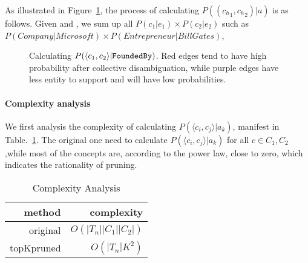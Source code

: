 \begin{example}
\label{exa:pggga}
As illustrated in Figure~\ref{fig:bipartite}, the process of calculating $P(({c_h}_{1},{c_h}_{2}) |a)$ is as follows.
Given  and , we sum up all $P(c_1|e_1)\times P(c_2|e_2) $ such as $P(Company|Microsoft) \times P(Entrepreneur|Bill Gates)$,
\end{example}


\begin{figure}[!htb]
\centering
{}
\caption{\small Calculating $P(  \langle {c}_{1},{c}_{2} \rangle  | {\tt FoundedBy} )$. Red edges tend to have high probability after collective disambiguation, while purple edges have less entity to support and will have low probabilities. }
\label{fig:bipartite}
\end{figure}

\paragraph{Complexity analysis}

We first analysis the complexity of calculating $P(\langle c_i, c_j \rangle|a_k)$, manifest in Table.~\ref{tab:complexity}. The original one need to calculate $P(\langle c_i, c_j \rangle|a_k)$ for all $c \in C_1,C_2 $,while most of the concepts are, according to the power law, close to zero, which indicates the rationality of pruning.


\begin{table}[htbp]
  \centering
  \caption{Complexity Analysis}
    \begin{tabular}{rr}
    \toprule
    method & complexity \\
    \midrule
    original &  $O(|T_n||C_1||C_2|)$ \\
    topKpruned & $O(|T_n|K^2)$ \\
    \bottomrule
    \end{tabular}%
  \label{tab:complexity}%
\end{table}%


